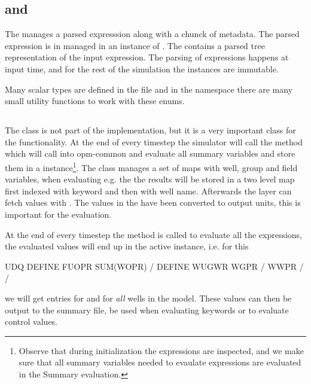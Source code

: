 \subsection*{ and }
The  manages a parsed \udq{} expresssion along with a
chunck of metadata. The parsed \udq{} expression is in managed in an instance of
. The  contains a parsed tree
representation of the \udq{} input expression. The parsing of \udq{} expressions
happens at input time, and for the rest of the simulation the
 instances are immutable.

Many scalar \udq{} types are defined in the file  and in the
namespace  there are many small utility functions to work with
these enums.


\subsection*{}
\label{summarystate}
The  class is not part of the \udq{} implementation,
but it is a very important class for the \udq{} functionality. At the end of
every timestep the simulator will call the method  which
will call into opm-common and evaluate all summary variables and store them in a
 instance\footnote{Observe that during initialization
the \udq{} expressions are inspected, and we make sure that all summary
variables needed to evaulate \udq{} expressions are evaluated in the Summary
evaluation.}. The  class manages a set of maps with
well, group and field variables, when evaluating e.g. the  the results
will be stored in a two level map first indexed with keyword  and then
with well name. Afterwards the \udq{} layer can fetch values with
. The values in the
 have been converted to output units, this is important
for the  evaluation.

At the end of every timestep the  method is called
to evaluate all the \udq{} expressions, the evaluated values will end up in the
active  instance, i.e. for this \udq{}
\begin{deck}
UDQ
  DEFINE FUOPR SUM(WOPR) /
  DEFINE WUGWR WGPR / WWPR /
/
\end{deck}
we will get  entries for  and  for
\emph{all} wells in the model. These  values can then
be output to the summary file, be used when evaluating  keywords or
to evaluate  control values.

